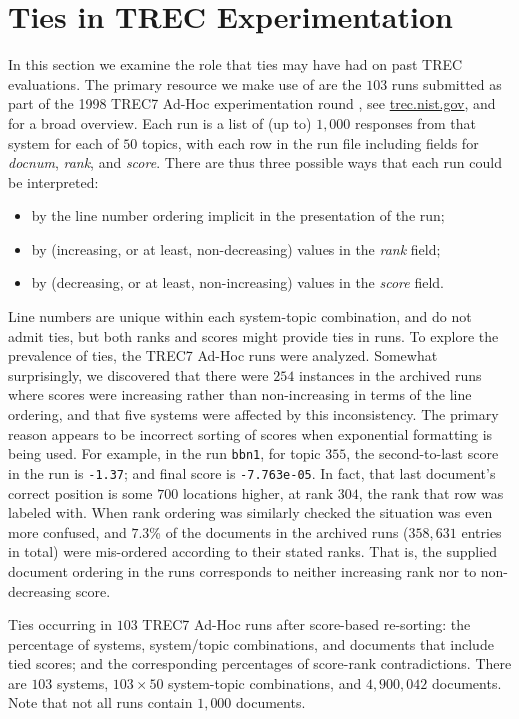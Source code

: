 \section{Ties in TREC Experimentation}
\label{sec-trecimpact}


In this section we examine the role that ties may have had on past
TREC evaluations.
The primary resource we make use of are the $103$ runs submitted as
part of the 1998 TREC7 Ad-Hoc experimentation round
{\citep{vh98trec}}, see {\small\url{trec.nist.gov}}, and
{\citet{harman05trecbook}} for a broad overview.
Each run is a list of (up to) $1{,}000$ responses from that system
for each of $50$ topics, with each row in the run file including
fields for {\emph{docnum}}, {\emph{rank}}, and {\emph{score}}.
There are thus three possible ways that each run could be
interpreted:
\begin{itemize}
\item
by the line number ordering implicit in the presentation of the run;
\item
by (increasing, or at least, non-decreasing) values in the
{\emph{rank}} field;
\item
by (decreasing, or at least, non-increasing) values in the
{\emph{score}} field.
\end{itemize}
Line numbers are unique within each system-topic combination, and do
not admit ties, but both ranks and scores might provide ties in runs.
To explore the prevalence of ties, the TREC7 Ad-Hoc runs were
analyzed.
Somewhat surprisingly, we discovered that there were $254$ instances
in the archived runs where scores were increasing rather than
non-increasing in terms of the line ordering, and that five systems
were affected by this inconsistency.
The primary reason appears to be incorrect sorting of scores when
exponential formatting is being used.
For example, in the run {\tt{bbn1}}, for topic $355$, the
second-to-last score in the run is {\tt{-1.37}}; and final score is
{\tt{-7.763e-05}}.
In fact, that last document's correct position is some $700$
locations higher, at rank $304$, the rank that row was labeled with.
When rank ordering was similarly checked the situation was even more
confused, and $7.3$\% of the documents in the archived runs
($358{,}631$ entries in total) were mis-ordered according to their
stated ranks.
That is, the supplied document ordering in the runs corresponds to
neither increasing rank nor to non-decreasing score.

\begin{table}[t!]
\centering

\renewcommand{\tabcolsep}{0.5em}
\caption{Ties occurring in $103$ TREC7 Ad-Hoc runs after score-based
re-sorting: the percentage of systems, system/topic combinations, and
documents that include tied scores; and the corresponding percentages
of score-rank contradictions.
There are $103$ systems, $103\times50$ system-topic
combinations, and $4{,}900{,}042$ documents.
Note that not all runs contain $1{,}000$ documents.
\label{tbl-trec7-ties}}
\end{table}

